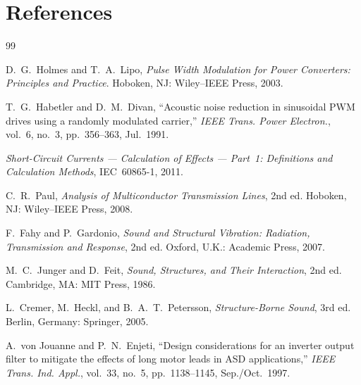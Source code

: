 \documentclass[11pt,a4paper]{article}
\begin{document}
\section*{References}
\begin{thebibliography}{99}

 D.~G.~Holmes and T.~A.~Lipo, \emph{Pulse Width Modulation for
Power Converters: Principles and Practice}. Hoboken, NJ: Wiley--IEEE Press, 2003.

 T.~G.~Habetler and D.~M.~Divan, ``Acoustic noise reduction in
sinusoidal PWM drives using a randomly modulated carrier,'' \emph{IEEE Trans. Power
Electron.}, vol.~6, no.~3, pp.~356--363, Jul.~1991.

 \emph{Short-Circuit Currents --- Calculation of Effects ---
Part~1: Definitions and Calculation Methods}, IEC~60865-1, 2011.

 C.~R.~Paul, \emph{Analysis of Multiconductor Transmission Lines},
2nd ed. Hoboken, NJ: Wiley--IEEE Press, 2008.

 F.~Fahy and P.~Gardonio, \emph{Sound and Structural Vibration:
Radiation, Transmission and Response}, 2nd ed. Oxford, U.K.: Academic Press, 2007.

 M.~C.~Junger and D.~Feit, \emph{Sound, Structures, and Their
Interaction}, 2nd ed. Cambridge, MA: MIT Press, 1986.

 L.~Cremer, M.~Heckl, and B.~A.~T.~Petersson,
\emph{Structure-Borne Sound}, 3rd ed. Berlin, Germany: Springer, 2005.

 A.~von Jouanne and P.~N.~Enjeti, ``Design considerations for
an inverter output filter to mitigate the effects of long motor leads in ASD
applications,'' \emph{IEEE Trans. Ind. Appl.}, vol.~33, no.~5, pp.~1138--1145,
Sep./Oct.~1997.

\end{thebibliography}

\appendix
\end{document}
